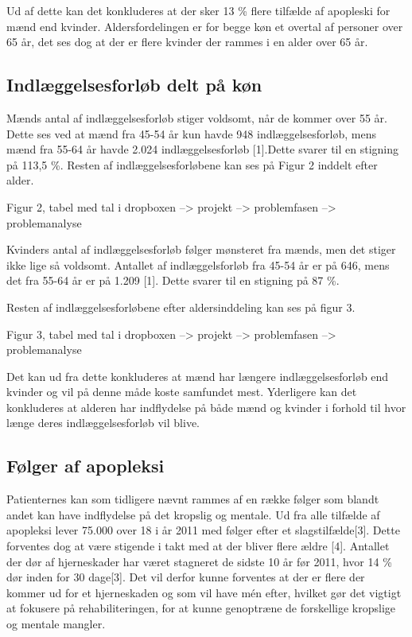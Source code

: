 Ud af dette kan det konkluderes at der sker 13 \% flere tilfælde af apopleski for mænd end kvinder. Aldersfordelingen er for begge køn et overtal af personer over 65 år, det ses dog at der er flere kvinder der rammes i en alder over 65 år.


\subsection{Indlæggelsesforløb delt på køn}
Mænds antal af indlæggelsesforløb stiger voldsomt, når de kommer over 55 år. Dette ses ved at mænd fra 45-54 år kun havde 948 indlæggelsesforløb, mens mænd fra 55-64 år havde 2.024 indlæggelsesforløb [1].Dette svarer til en stigning på 113,5 \%. Resten af indlæggelsesforløbene kan ses på Figur 2 inddelt efter alder.

Figur 2, tabel med tal i dropboxen --> projekt --> problemfasen --> problemanalyse

Kvinders antal af indlæggelsesforløb følger mønsteret fra mænds, men det stiger ikke lige så voldsomt. Antallet af indlæggelsforløb fra 45-54 år er på 646, mens det fra 55-64 år er på 1.209 [1]. Dette svarer til en stigning på 87 \%.

Resten af indlæggelsesforløbene efter aldersinddeling kan ses på figur 3.

Figur 3, tabel med tal i dropboxen --> projekt --> problemfasen --> problemanalyse

Det kan ud fra dette konkluderes at mænd har længere indlæggelsesforløb end kvinder og vil på denne måde koste samfundet mest. Yderligere kan det konkluderes at alderen har indflydelse på både mænd og kvinder i forhold til hvor længe deres indlæggelsesforløb vil blive.

\subsection{Følger af apopleksi}
Patienternes kan som tidligere nævnt rammes af en række følger som blandt andet kan have indflydelse på det kropslig og mentale. Ud fra alle tilfælde af apopleksi lever 75.000 over 18 i år 2011 med følger efter et slagstilfælde[3]. Dette forventes dog at være stigende i takt med at der bliver flere ældre [4]. 
Antallet der dør af hjerneskader har været stagneret de sidste 10 år før 2011, hvor 14 \% dør inden for 30 dage[3]. 
Det vil derfor kunne forventes at der er flere der kommer ud for et hjerneskaden og som vil have mén efter, hvilket gør det vigtigt at fokusere på rehabiliteringen, for at kunne genoptræne de forskellige kropslige og mentale mangler.

